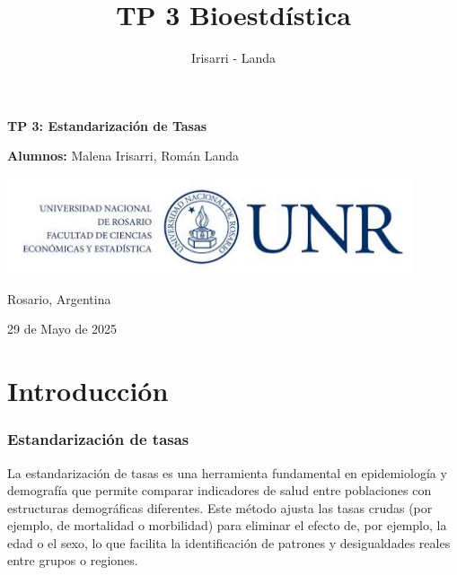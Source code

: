 \documentclass[
]{article}
\title{TP 3 Bioestdística}
\author{Irisarri - Landa}
\date{}
\begin{document}
\maketitle

\thispagestyle{empty}

\begin{center}
  \vspace*{1cm}

  \Huge
  \textbf{TP 3: Estandarización de Tasas}

  \vspace{0.5cm}
  \LARGE

  \vspace{1.5cm}

  \textbf{Alumnos:}  Malena Irisarri, Román Landa\\

  \vfill

  \includegraphics[width=0.9\textwidth]{../tp2/img/logo_universidad.jpg}

  \vspace{0.8cm}


  Rosario, Argentina

  29 de Mayo de 2025
\end{center}

\newpage

\section{Introducción}\label{introducciuxf3n}

\subsubsection{Estandarización de
tasas}\label{estandarizaciuxf3n-de-tasas}

La estandarización de tasas es una herramienta fundamental en
epidemiología y demografía que permite comparar indicadores de salud
entre poblaciones con estructuras demográficas diferentes. Este método
ajusta las tasas crudas (por ejemplo, de mortalidad o morbilidad) para
eliminar el efecto de, por ejemplo, la edad o el sexo, lo que facilita
la identificación de patrones y desigualdades reales entre grupos o
regiones.
\end{document}
